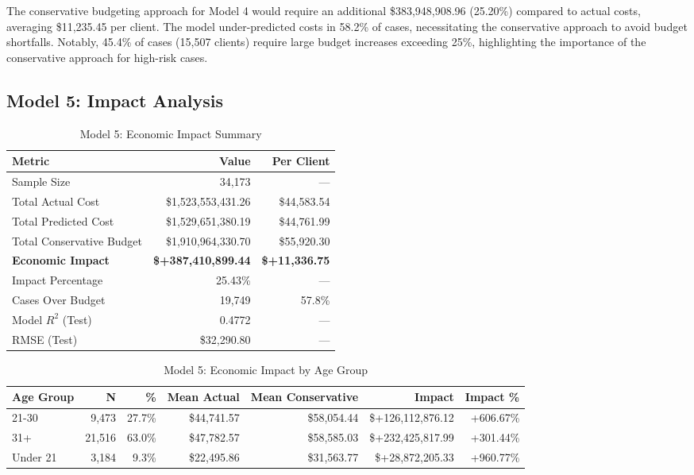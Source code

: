 The conservative budgeting approach for Model 4 would require an additional \$383,948,908.96 (25.20\%) compared to actual costs, averaging \$11,235.45 per client. The model under-predicted costs in 58.2\% of cases, necessitating the conservative approach to avoid budget shortfalls. Notably, 45.4\% of cases (15,507 clients) require large budget increases exceeding 25\%, highlighting the importance of the conservative approach for high-risk cases. 

\clearpage

\subsection{Model 5: Impact Analysis}
\label{subsec:model5_impact}

\begin{table}[htbp]
\centering
\small
\caption{Model 5: Economic Impact Summary}
\label{tab:model5_impact_summary}
\begin{tabular}{lrr}
\toprule
\textbf{Metric} & \textbf{Value} & \textbf{Per Client} \\
\midrule
Sample Size & 34,173 & --- \\
\midrule
Total Actual Cost & \$1,523,553,431.26 & \$44,583.54 \\
Total Predicted Cost & \$1,529,651,380.19 & \$44,761.99 \\
Total Conservative Budget & \$1,910,964,330.70 & \$55,920.30 \\
\midrule
\textbf{Economic Impact} & \textbf{\$+387,410,899.44} & \textbf{\$+11,336.75} \\
Impact Percentage & 25.43\% & --- \\
\midrule
Cases Over Budget & 19,749 & 57.8\% \\
\midrule
Model $R^2$ (Test) & 0.4772 & --- \\
RMSE (Test) & \$32,290.80 & --- \\
\bottomrule
\end{tabular}
\end{table}

\begin{table}[htbp]
\centering
\small
\caption{Model 5: Economic Impact by Age Group}
\label{tab:model5_impact_age}
\begin{tabular}{lrrrrrr}
\toprule
\textbf{Age Group} & \textbf{N} & \textbf{\%} & \textbf{Mean Actual} & \textbf{Mean Conservative} & \textbf{Impact} & \textbf{Impact \%} \\
\midrule
21-30 & 9,473 & 27.7\% & \$44,741.57 & \$58,054.44 & \$+126,112,876.12 & +606.67\% \\
31+ & 21,516 & 63.0\% & \$47,782.57 & \$58,585.03 & \$+232,425,817.99 & +301.44\% \\
Under 21 & 3,184 & 9.3\% & \$22,495.86 & \$31,563.77 & \$+28,872,205.33 & +960.77\% \\
\bottomrule
\end{tabular}
\end{table}

